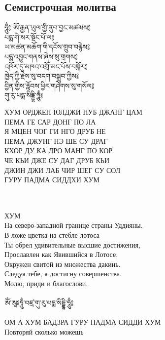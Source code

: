\subsection*{Семистрочная молитва}

\begingroup
\parbox[t][][l]{0.40\textwidth}{
\ti ཧཱུྃ༔ ཨོ་རྒྱན་ཡུལ་གྱི་ནུབ་བྱང་མཚམས༔\\
པདྨ་གེ་སར་སྡོང་པོ་ལ༔\\
ཡ་མཚན་མཆོག་གི་དངོས་གྲུབ་བརྙེས༔\\
པདྨ་འབྱུང་གནས་ཞེས་སུ་གྲགས༔\\
འཁོར་དུ་མཁའ་འགྲོ་མང་པོས་བསྐོར༔\\
ཁྱེད་ཀྱི་རྗེས་སུ་བདག་བསྒྲུབ་ཀྱིས༔\\
བྱིན་གྱིས་རློབས་ཕྱིར་གཤེགས་སུ་གསོལ༔\\
གུ་རུ་པདྨ་སིདྡྷི་ཧཱུྃ༔\\
\ru
}
\hspace{0.2cm}
\parbox[t][][r]{0.60\textwidth}{
\small
\vspace{0.1cm}
ХУМ ОРДЖЕН ЮЛДЖИ НУБ ДЖАНГ ЦАМ\\
ПЕМА ГЕ САР ДОНГ ПО ЛА\\
Я МЦЕН ЧОГ ГИ НГО ДРУБ НЕ\\
ПЕМА ДЖУНГ НЭ ШЕ СУ ДРАГ\\
КХОР ДУ КА ДРО МАНГ ПО КОР\\
ЧЕ КЬИ ДЖЕ СУ ДАГ ДРУБ КЬИ\\
ДЖИН ДЖИ ЛАБ ЧИР ШЕГ СУ СОЛ\\
ГУРУ ПАДМА СИДДХИ ХУМ\\
}
\endgroup
\\
\\
ХУМ \\
На северо-западной границе страны Уддияны,\\
В ложе цветка на стебле лотоса\\
Ты обрел удивительные высшие достижения,\\
Прославлен как Явившийся в Лотосе,\\
Окружен свитой из множества дакинь.\\
Следуя тебе, я достигну совершенства.\\
Молю, приди и благослови.\\
\\
\ti ཨོཾ་ཨཱཿཧཱུྃ་བཛྲ་གུ་རུ་པདྨ་སིདྡྷི་ཧཱུྃ༔\\
\\
\ru ОМ А ХУМ БАДЗРА ГУРУ ПАДМА СИДДИ ХУМ\\
\scriptsize
Повторяй сколько можешь
\normalsize
